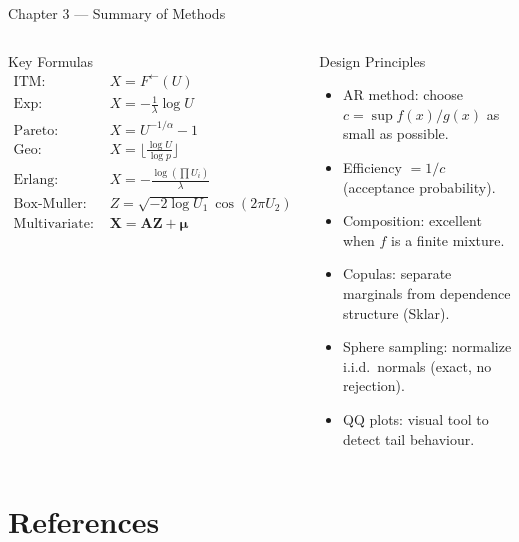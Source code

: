 \documentclass[aspectratio=169,10pt]{beamer}
\begin{document}
\begin{frame}[allowframebreaks]{Chapter 3 --- Summary of Methods}
  \framebreak

  \begin{columns}
    \begin{block}{Key Formulas}
      \begin{align*}
        \text{ITM: } & X = F^{\leftarrow}(U) \\[4pt]
        \text{Exp: } & X = -\tfrac{1}{\lambda}\log U \\[4pt]
        \text{Pareto: } & X = U^{-1/\alpha} - 1 \\[4pt]
        \text{Geo: } & X = \lfloor \tfrac{\log U}{\log p}\rfloor \\[4pt]
        \text{Erlang: } & X = -\tfrac{\log(\prod U_i)}{\lambda} \\[4pt]
        \text{Box-Muller: }& Z = \sqrt{-2\log U_1}\cos(2\pi U_2) \\[4pt]
        \text{Multivariate: }& \mathbf{X} = \mathbf{A}\mathbf{Z}+\boldsymbol{\mu}
      \end{align*}
    \end{block}

    \begin{block}{Design Principles}
      \begin{itemize}
        \item AR method: choose $c = \sup f(x)/g(x)$ as small as possible.
        \item Efficiency $= 1/c$ (acceptance probability).
        \item Composition: excellent when $f$ is a finite mixture.
        \item Copulas: separate marginals from dependence structure (Sklar).
        \item Sphere sampling: normalize i.i.d.\ normals (exact, no rejection).
        \item QQ plots: visual tool to detect tail behaviour.
      \end{itemize}
    \end{block}
  \end{columns}
\end{frame}

\section*{References}
\end{document}
